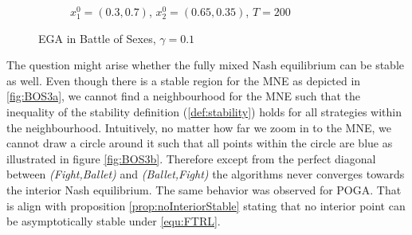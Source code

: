 \begin{figure}[H]
\begin{subfigure}{.5\textwidth}
    \caption{$x_{1}^0 = (0.3,0.7)$, $x_{2}^0 = (0.65,0.35)$, $T = 200$}
    \label{fig:BOS2b}
\end{subfigure}
\caption{EGA in Battle of Sexes, $\gamma = 0.1$}
\label{fig:BOS2}
\end{figure}

The question might arise whether the fully mixed Nash equilibrium can be stable as well. Even though there is a stable region for the MNE as depicted in \ref{fig:BOS3a}, we cannot find a neighbourhood for the MNE such that the inequality of the stability definition (\ref{def:stability}) holds for all strategies within the neighbourhood. Intuitively, no matter how far we zoom in to the MNE, we cannot draw a circle around it such that all points within the circle are blue as illustrated in figure \ref{fig:BOS3b}. Therefore except from the perfect diagonal between \textit{(Fight,Ballet)} and \textit{(Ballet,Fight)} the algorithms never converges towards the interior Nash equilibrium. The same behavior was observed for POGA. That is align with proposition \ref{prop:noInteriorStable} stating that no interior point can be asymptotically stable under \ref{equ:FTRL}. 

